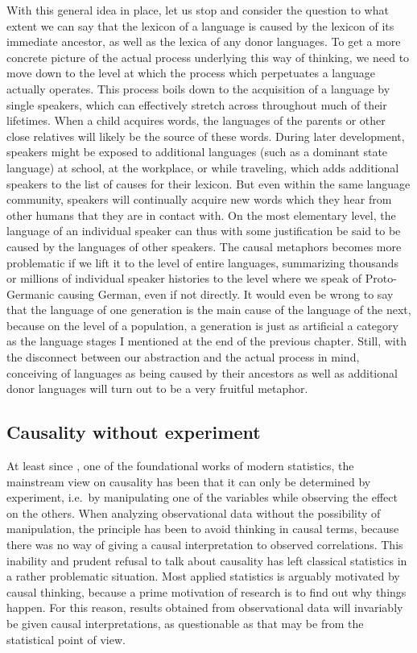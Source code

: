 With this general idea in place, let us stop and consider the question to what extent we can say that the lexicon of a language is caused by the lexicon of its immediate ancestor, as well as the lexica of any donor languages. To get a more concrete picture of the actual process underlying this way of thinking, we need to move down to the level at which the process which perpetuates a language actually operates. This process boils down to the acquisition of a language by single speakers, which can effectively stretch across throughout much of their lifetimes. When a child acquires words, the languages of the parents or other close relatives will likely be the source of these words. During later development, speakers might be exposed to additional languages (such as a dominant state language) at school, at the workplace, or while traveling, which adds additional speakers to the list of causes for their lexicon. But even within the same language community, speakers will continually acquire new words which they hear from other humans that they are in contact with. On the most elementary level, the language of an individual speaker can thus with some justification be said to be caused by the languages of other speakers. The causal metaphors becomes more problematic if we lift it to the level of entire languages, summarizing thousands or millions of individual speaker histories to the level where we speak of Proto-Germanic causing German, even if not directly. It would even be wrong to say that the language of one generation is the main cause of the language of the next, because on the level of a population, a generation is just as artificial a category as the language stages I mentioned at the end of the previous chapter. Still, with the disconnect between our abstraction and the actual process in mind, conceiving of languages as being caused by their ancestors as well as additional donor languages will turn out to be a very fruitful metaphor.

\subsection{Causality without experiment}
At least since \cite{fisher1925}, one of the foundational works of modern statistics, the mainstream view on causality has been that it can only be determined by experiment, i.e.\ by manipulating one of the variables while observing the effect on the others. When analyzing observational data without the possibility of manipulation, the principle has been to avoid thinking in causal terms, because there was no way of giving a causal interpretation to observed correlations. This inability and prudent refusal to talk about causality has left classical statistics in a rather problematic situation. Most applied statistics is arguably motivated by causal thinking, because a prime motivation of research is to find out why things happen. For this reason, results obtained from observational data will invariably be given causal interpretations, as questionable as that may be from the statistical point of view.

